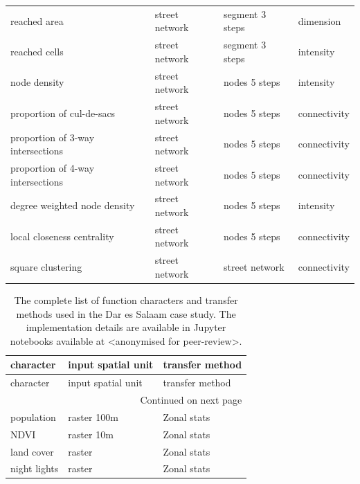 \begin{longtable}{p{5cm}p{4cm}p{4cm}l}
                            reached area &                  street network &            segment 3 steps &    dimension \\
                           reached cells &                  street network &            segment 3 steps &    intensity \\
                            node density &                  street network &              nodes 5 steps &    intensity \\
               proportion of cul-de-sacs &                  street network &              nodes 5 steps & connectivity \\
       proportion of 3-way intersections &                  street network &              nodes 5 steps & connectivity \\
       proportion of 4-way intersections &                  street network &              nodes 5 steps & connectivity \\
            degree weighted node density &                  street network &              nodes 5 steps &    intensity \\
              local closeness centrality &                  street network &              nodes 5 steps & connectivity \\
                       square clustering &                  street network &             street network & connectivity \\
\end{longtable}


\begin{longtable}{p{5cm}p{3cm}p{5cm}}
    \caption{The complete list of function characters and transfer methods used in the Dar es Salaam case study. The implementation details are available
    in Jupyter notebooks available at <anonymised for peer-review>.}
    \label{tab:fn_des} \\
    \toprule
                                             character & input spatial unit &                                    transfer method \\
    \midrule
    \endfirsthead

    \toprule
                                             character & input spatial unit &                                    transfer method \\
    \midrule
    \endhead
    \midrule
    \multicolumn{3}{r}{{Continued on next page}} \\
    \midrule
    \endfoot

    \bottomrule
    \endlastfoot
    population & raster 100m &     Zonal stats \\
          NDVI &  raster 10m &     Zonal stats \\
    land cover &      raster &     Zonal stats \\
  night lights &      raster &     Zonal stats \\
\end{longtable}

